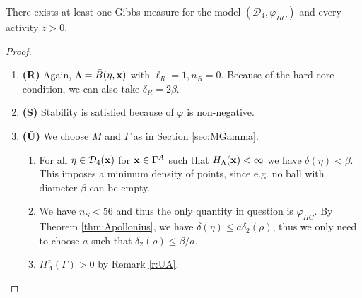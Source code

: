 \begin{theorem}\label{thm:E2}
	There exists at least one Gibbs measure for the model $(\mathcal D_4,\varphi_{HC})$ and every activity $z>0.$
\end{theorem}
\begin{proof}
\begin{enumerate}[]
	\item \textbf{(R)} Again, $\Lambda = \bar B(\eta,{\mathbf{x}})$ with $\ell_R = 1, n_R = 0$. Because of the hard-core condition, we can also take $\delta_R = 2\beta$.
	\item \textbf{(S)} Stability is satisfied because of $\varphi$ is non-negative.
	\item \textbf{(\^U)} We choose $M$ and $\Gamma$ as in Section \ref{sec:MGamma}.
		\begin{enumerate}[(\^U1)]
			\item For all $\eta \in \mathcal D_4({\mathbf{x}})$ for ${\mathbf{x}}\in\Gamma^A$ such that $H_\Lambda({\mathbf{x}})<\infty$ we have $\delta(\eta) < \beta$. This imposes a minimum density of points, since e.g. no ball with diameter $\beta$ can be empty. 
			\item We have $n_S<56$ and thus the only quantity in question is $\varphi_{HC}$. By Theorem \ref{thm:Apollonius}, we have $\delta(\eta)\leq a\delta_2(\rho)$, thus we only need to choose $a$ such that $\delta_2(\rho) \leq \beta / a$.
			\item $\Pi^z_\Lambda(\Gamma)>0$ by Remark \ref{r:UA}.
		\end{enumerate}
\end{enumerate}
\end{proof}




